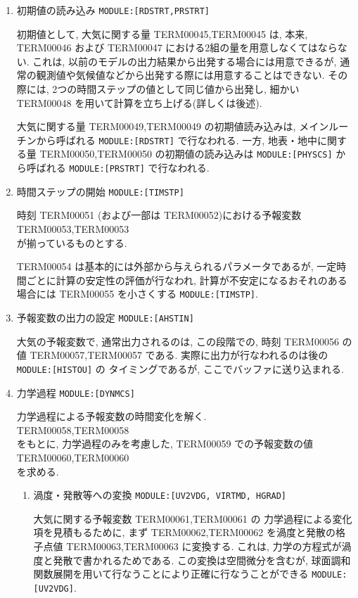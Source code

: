 \begin{enumerate}
\item 初期値の読み込み \texttt{MODULE:[RDSTRT,PRSTRT]}

初期値として, 大気に関する量 TERM00045,TERM00045 は, 本来,
TERM00046 および TERM00047 における2組の量を用意しなくてはならない.
これは, 以前のモデルの出力結果から出発する場合には用意できるが,
通常の観測値や気候値などから出発する際には用意することはできない.
その際には, 2つの時間ステップの値として同じ値から出発し,
細かい TERM00048 を用いて計算を立ち上げる(詳しくは後述).

大気に関する量 TERM00049,TERM00049 の初期値読み込みは,
メインルーチンから呼ばれる  \texttt{MODULE:[RDSTRT]} で行なわれる.
一方, 地表・地中に関する量 TERM00050,TERM00050 の初期値の読み込みは
\texttt{MODULE:[PHYSCS]} から呼ばれる \texttt{MODULE:[PRSTRT]} で行なわれる.


\item 時間ステップの開始 \texttt{MODULE:[TIMSTP]}

時刻 TERM00051 (および一部は TERM00052)における予報変数  \\
TERM00053,TERM00053 \\
が揃っているものとする.

TERM00054 は基本的には外部から与えられるパラメータであるが,
一定時間ごとに計算の安定性の評価が行なわれ,
計算が不安定になるおそれのある場合には
TERM00055 を小さくする \texttt{MODULE:[TIMSTP]}.

\item 予報変数の出力の設定 \texttt{MODULE:[AHSTIN]}

大気の予報変数で, 通常出力されるのは,
この段階での, 時刻 TERM00056 の値
TERM00057,TERM00057
である.
実際に出力が行なわれるのは後の \texttt{MODULE:[HISTOU]} の
タイミングであるが, ここでバッファに送り込まれる.

\item 力学過程 \texttt{MODULE:[DYNMCS]} 

力学過程による予報変数の時間変化を解く. \\
TERM00058,TERM00058 \\
をもとに, 
力学過程のみを考慮した, TERM00059 での予報変数の値 \\
TERM00060,TERM00060 \\
を求める.

\begin{enumerate}
\item 渦度・発散等への変換 \texttt{MODULE:[UV2VDG, VIRTMD, HGRAD]}

大気に関する予報変数 TERM00061,TERM00061 の
力学過程による変化項を見積もるために, まず
TERM00062,TERM00062 を渦度と発散の格子点値 TERM00063,TERM00063 に変換する.
これは, 力学の方程式が渦度と発散で書かれるためである.
この変換は空間微分を含むが,
球面調和関数展開を用いて行なうことにより正確に行なうことができる 
\texttt{MODULE:[UV2VDG]}.


\end{enumerate}
\end{enumerate}
